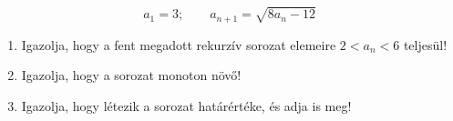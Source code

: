 \documentclass[11pt]{scrartcl}
\begin{document}
\[
	a_1 = 3; \qquad a_{n + 1} = \sqrt{8a_n - 12}
\]
\begin{enumerate}
	\item Igazolja, hogy a fent megadott rekurzív sorozat elemeire
	      $2 < a_n < 6$ teljesül!

	\item Igazolja, hogy a sorozat monoton növő!

	\item Igazolja, hogy létezik a sorozat határértéke, és adja is meg!
\end{enumerate}
\end{document}
